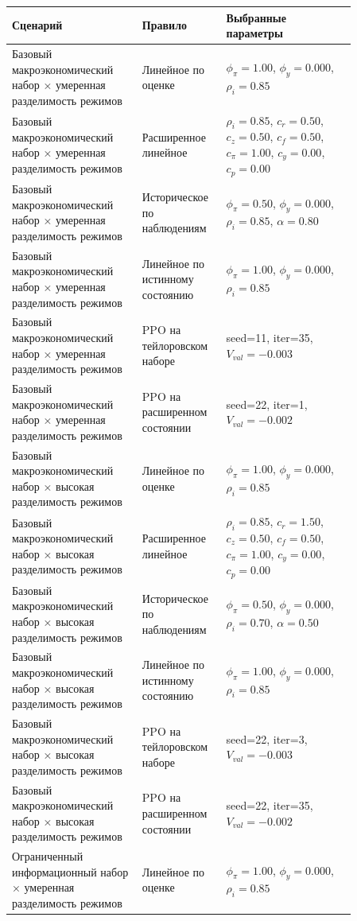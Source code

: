 \begin{tabular}{p{0.34\linewidth}p{0.18\linewidth}p{0.34\linewidth}}
\toprule
Сценарий & Правило & Выбранные параметры \\
\midrule
Базовый макроэкономический набор × умеренная разделимость режимов & Линейное по оценке & $\phi_\pi=1.00$, $\phi_y=0.000$, $\rho_i=0.85$ \\
Базовый макроэкономический набор × умеренная разделимость режимов & Расширенное линейное & $\rho_i=0.85$, $c_r=0.50$, $c_z=0.50$, $c_f=0.50$, $c_\pi=1.00$, $c_y=0.00$, $c_p=0.00$ \\
Базовый макроэкономический набор × умеренная разделимость режимов & Историческое по наблюдениям & $\phi_\pi=0.50$, $\phi_y=0.000$, $\rho_i=0.85$, $\alpha=0.80$ \\
Базовый макроэкономический набор × умеренная разделимость режимов & Линейное по истинному состоянию & $\phi_\pi=1.00$, $\phi_y=0.000$, $\rho_i=0.85$ \\
Базовый макроэкономический набор × умеренная разделимость режимов & PPO на тейлоровском наборе & seed=11, iter=35, $V_{val}=-0.003$ \\
Базовый макроэкономический набор × умеренная разделимость режимов & PPO на расширенном состоянии & seed=22, iter=1, $V_{val}=-0.002$ \\
Базовый макроэкономический набор × высокая разделимость режимов & Линейное по оценке & $\phi_\pi=1.00$, $\phi_y=0.000$, $\rho_i=0.85$ \\
Базовый макроэкономический набор × высокая разделимость режимов & Расширенное линейное & $\rho_i=0.85$, $c_r=1.50$, $c_z=0.50$, $c_f=0.50$, $c_\pi=1.00$, $c_y=0.00$, $c_p=0.00$ \\
Базовый макроэкономический набор × высокая разделимость режимов & Историческое по наблюдениям & $\phi_\pi=0.50$, $\phi_y=0.000$, $\rho_i=0.70$, $\alpha=0.50$ \\
Базовый макроэкономический набор × высокая разделимость режимов & Линейное по истинному состоянию & $\phi_\pi=1.00$, $\phi_y=0.000$, $\rho_i=0.85$ \\
Базовый макроэкономический набор × высокая разделимость режимов & PPO на тейлоровском наборе & seed=22, iter=3, $V_{val}=-0.003$ \\
Базовый макроэкономический набор × высокая разделимость режимов & PPO на расширенном состоянии & seed=22, iter=35, $V_{val}=-0.002$ \\
Ограниченный информационный набор × умеренная разделимость режимов & Линейное по оценке & $\phi_\pi=1.00$, $\phi_y=0.000$, $\rho_i=0.85$ \\

\end{tabular}
